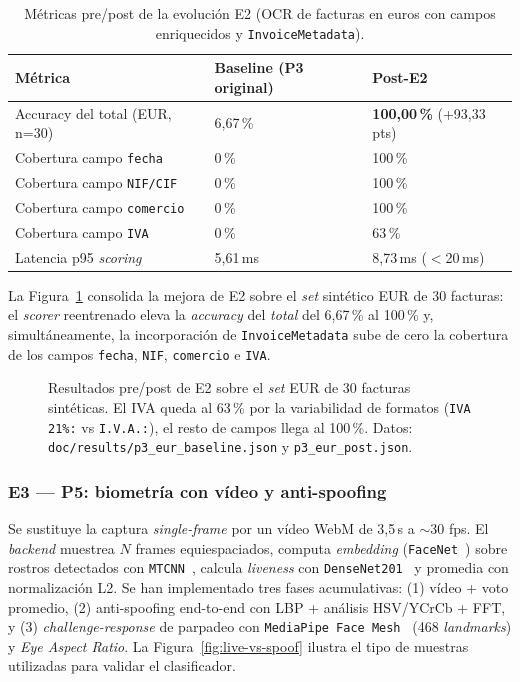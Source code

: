 \begin{table}[!htbp]
  \centering
  \footnotesize
  \begin{tabularx}{\linewidth}{@{}lYY@{}}
    \toprule
    \textbf{Métrica} & \textbf{Baseline (P3 original)} & \textbf{Post-E2} \\
    \midrule
    Accuracy del total (EUR, n=30) & 6{,}67\,\% & \textbf{100{,}00\,\%} (+93{,}33 pts) \\
    Cobertura campo \texttt{fecha} & 0\,\% & 100\,\% \\
    Cobertura campo \texttt{NIF/CIF} & 0\,\% & 100\,\% \\
    Cobertura campo \texttt{comercio} & 0\,\% & 100\,\% \\
    Cobertura campo \texttt{IVA} & 0\,\% & 63\,\% \\
    Latencia p95 \textit{scoring} & 5{,}61\,ms & 8{,}73\,ms ($<$20\,ms) \\
    \bottomrule
  \end{tabularx}
  \caption{Métricas pre/post de la evolución E2 (OCR de facturas
  en euros con campos enriquecidos y \texttt{InvoiceMetadata}).}
  \label{tab:metrics-e2}
\end{table}

\newpage
La Figura~\ref{fig:e2-eur} consolida la mejora de E2 sobre el
\textit{set} sintético EUR de 30 facturas: el \textit{scorer}
reentrenado eleva la \textit{accuracy} del \textit{total} del
6{,}67\,\% al 100\,\% y, simultáneamente, la incorporación de
\texttt{InvoiceMetadata} sube de cero la cobertura de los campos
\texttt{fecha}, \texttt{NIF}, \texttt{comercio} e \texttt{IVA}.

\begin{figure}[t]
    \centering
    
    \caption{Resultados pre/post de E2 sobre el \textit{set} EUR de
    30 facturas sintéticas. El IVA queda al 63\,\% por la
    variabilidad de formatos (\texttt{IVA 21\%:} vs \texttt{I.V.A.:}),
    el resto de campos llega al 100\,\%. Datos:
    \texttt{doc/results/p3\_eur\_baseline.json} y
    \texttt{p3\_eur\_post.json}.}
    \label{fig:e2-eur}
\end{figure}

\subsubsection*{E3 --- P5: biometría con vídeo y anti-spoofing}

Se sustituye la captura \textit{single-frame} por un vídeo WebM de
3{,}5\,s a $\sim$30 fps. El \textit{backend} muestrea $N$ frames
equiespaciados, computa \textit{embedding} (\texttt{FaceNet}~\cite{facenet})
sobre rostros detectados con \texttt{MTCNN}~\cite{mtcnn}, calcula
\textit{liveness} con \texttt{DenseNet201}~\cite{densenet} y promedia
con normalización L2. Se han implementado tres fases acumulativas:
(1) vídeo + voto promedio, (2) anti-spoofing end-to-end con LBP +
análisis HSV/YCrCb + FFT, y (3) \textit{challenge-response} de
parpadeo con \texttt{MediaPipe Face Mesh}~\cite{mediapipe} (468
\textit{landmarks}) y \textit{Eye Aspect Ratio}. La
Figura~\ref{fig:live-vs-spoof} ilustra el tipo de muestras utilizadas
para validar el clasificador.

